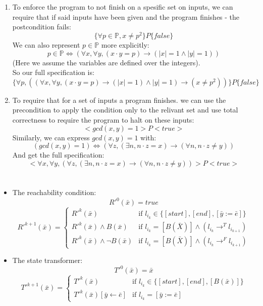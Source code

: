 \documentclass{article}
\begin{document}
\section{}
\begin{enumerate}[label=\Alph*.]
    \item To enforce the program to not finish
    on a spesific set on inputs, we can require that if
    said inputs have been given and the program finishes - 
    the postcondition fails:
    \[\{\forall p\in\mathbb{P}, x\neq p^2\}P\{false\}\]
    We can also represent $p\in\mathbb{P}$ more explicitly:
    \[p\in\mathbb{P}\Leftrightarrow
    (\forall x,\forall y, (x\cdot y=p)\rightarrow (|x|=1\wedge|y|=1))\]
    (Here we assume the variables are defined over the integers).\\
    So our full specification is:
    \[\{\forall p,
    ((\forall x,\forall y, (x\cdot y=p)\rightarrow (|x|=1)\wedge|y|=1)
    \rightarrow
    (x\neq p^2))\}P\{false\}\]
    \item To require that for a set of inputs a program finishes.
    we can use the precondition to apply the condition only to
    the relivant set and use total correctness to require the program to halt
    on these inputs:
    \[<gcd(x,y)=1>P<true>\]
    Similarly, we can express $gcd(x,y)=1$ with:
    \[
        (gcd(x,y)=1)
    \Leftrightarrow
        (\forall z,(\exists n, n\cdot z=x)\rightarrow (\forall n, n\cdot z\neq y))
    \]
    And get the full specification:
    \[<\forall x,\forall y,(\forall z,(\exists n, n\cdot z=x)\rightarrow (\forall n, n\cdot z\neq y))>P<true>\]
\end{enumerate}

\section{}
\begin{itemize}
    \item The reachability condition:
    \[
        R'^0(\bar{x})=true
    \]
    \[
        R'^{k+1}(\bar{x})=
        \begin{cases}
            R'^k(\bar{x}) & \text{if } l_{i_k}\in\{[start], [end], [\bar{y}:=\bar{e}]\}\\
            R'^k(\bar{x})\wedge B(\bar{x}) & \text{if } l_{i_k}=[B(\bar{X})]\wedge (l_{i_k}\rightarrow^Tl_{i_{k+1}})\\
            R'^k(\bar{x})\wedge \neg B(\bar{x}) & \text{if } l_{i_k}=[B(\bar{X})]\wedge (l_{i_k}\rightarrow^Fl_{i_{k+1}})

        \end{cases}    
    \]
    \item The state transformer:
    \[
        T'^0(\bar{x})=\bar{x}    
    \]
    \[
        T'^{k+1}(\bar{x})=
        \begin{cases}
            T'^k(\bar{x}) & \text{if } l_{i_k}\in\{[start], [end], [B(\bar{x})]\}\\
            T'^k(\bar{x})[\bar{y}\leftarrow\bar{e}] & \text{if } l_{i_k}=[\bar{y}:=\bar{e}]
        \end{cases}    
    \]
\end{itemize}
\end{document}
